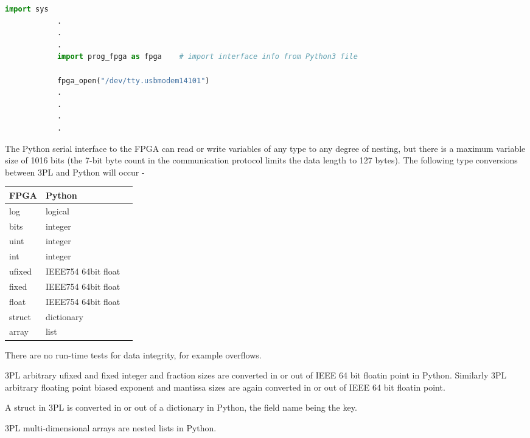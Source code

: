         \begin{lstlisting}[gobble=4, language=Python]
            import sys
            .
            .
            .
            import prog_fpga as fpga    # import interface info from Python3 file

            fpga_open("/dev/tty.usbmodem14101")
            .
            .
            .
            .
        \end{lstlisting}
        
        
        The Python serial interface to the FPGA can read or write variables of
        any type to any degree of nesting, but there is a maximum variable size
        of 1016 bits (the 7-bit byte count in the communication protocol limits
        the data length to 127 bytes). The following type conversions between
        3PL and Python will occur -
         
        \begin{tabular}{| l | l | l |}
        \hline
        FPGA    & Python                \\
        \hline
        log     & logical               \\
        bits    & integer               \\
        uint    & integer               \\
        int     & integer               \\
        ufixed  & IEEE754 64bit float   \\
        fixed   & IEEE754 64bit float   \\
        float   & IEEE754 64bit float   \\
        struct  & dictionary            \\
        array   & list                  \\
        \hline
        \end{tabular}
        
        There are no run-time tests for data integrity, for example overflows.
        
        3PL arbitrary ufixed and fixed integer and fraction sizes are converted
        in or out of IEEE 64 bit floatin point in Python. Similarly 3PL arbitrary
        floating point biased exponent and mantissa sizes are again converted
        in or out of IEEE 64 bit floatin point.
        
        A struct in 3PL is converted in or out of a dictionary in Python, the
        field name being the key.
        
        3PL multi-dimensional arrays are nested lists in Python.
